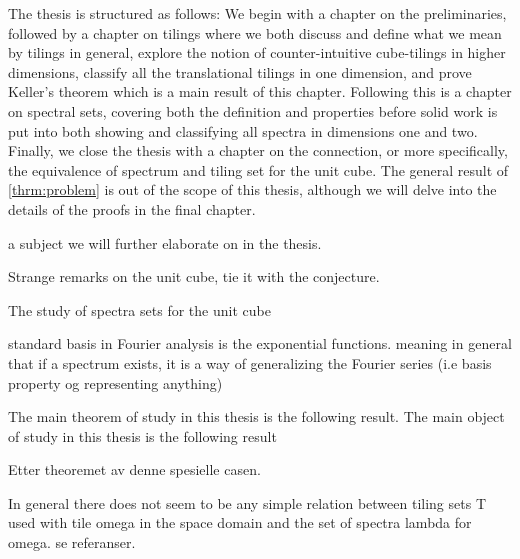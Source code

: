 \documentclass[../thesis.tex]{subfiles}
\begin{document}
The thesis is structured as follows: We begin with a chapter on the preliminaries, followed by a chapter on tilings where we both discuss and define what we mean by tilings in general, explore the notion of counter-intuitive cube-tilings in higher dimensions, classify all the translational tilings in one dimension, and prove Keller's theorem which is a main result of this chapter. Following this is a chapter on spectral sets, covering both the definition and properties before solid work is put into both showing and classifying all spectra in dimensions one and two. Finally, we close the thesis with a chapter on the connection, or more specifically, the equivalence of spectrum and tiling set for the unit cube. The general result of \cref{thrm:problem} is out of the scope of this thesis, although we will delve into the details of the proofs in the final chapter.



a subject we will further elaborate on in the thesis. 


Strange remarks on the unit cube, tie it with the conjecture.

The study of spectra sets for the unit cube 



standard basis in Fourier analysis is the exponential functions. 
meaning in general that if a spectrum exists, it is a way of generalizing the Fourier series (i.e basis property og representing anything)



The main theorem of study in this thesis is the following result. 
The main object of study in this thesis is the following result 



Etter theoremet av denne spesielle casen. 

In general there does not seem to be any simple relation between tiling sets T used with tile omega in the space domain and the set of spectra lambda for omega. se referanser. 
\end{document}
